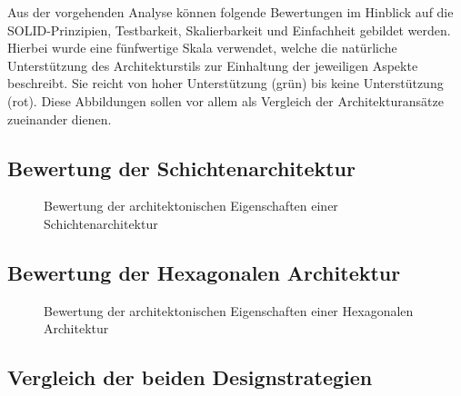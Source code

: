 \documentclass[conference]{IEEEtran}
\begin{document}
Aus der vorgehenden Analyse können folgende Bewertungen im Hinblick auf die SOLID-Prinzipien, Testbarkeit, Skalierbarkeit und Einfachheit gebildet werden. Hierbei wurde eine fünfwertige Skala verwendet, welche die natürliche Unterstützung des Architekturstils zur Einhaltung der jeweiligen Aspekte beschreibt. Sie reicht von hoher Unterstützung (grün) bis keine Unterstützung (rot). Diese Abbildungen sollen vor allem als Vergleich der Architekturansätze zueinander dienen.

\subsection{Bewertung der Schichtenarchitektur}


\begin{figure}[htbp]
	
	\caption{Bewertung der architektonischen Eigenschaften einer Schichtenarchitektur}
	\label{SchichtenarchitekturBewertung}
\end{figure}

\subsection{Bewertung der Hexagonalen Architektur}

\begin{figure}[htbp]
	
	\caption{Bewertung der architektonischen Eigenschaften einer Hexagonalen Architektur}	\label{HexagonaleArchitekturBewertung}
\end{figure}

\subsection{Vergleich der beiden Designstrategien}
\end{document}
